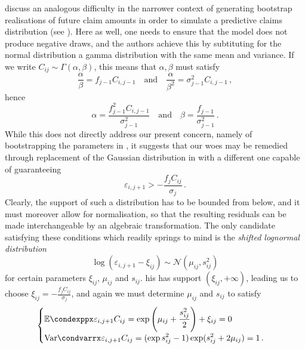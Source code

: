 \documentclass[a4paper]{book}
\begin{document}
\Textcite[238]{england:dist} discuss an analogous difficulty in the narrower context of generating bootstrap realisations of future claim amounts in order to simulate a predictive claims distribution (see ). Here as well, one needs to ensure that the model does not produce negative draws, and the authors achieve this by subtituting for the normal distribution a gamma distribution with the same mean and variance. If we write $C_{ij} \sim \Gamma(\alpha, \beta)$, this means that $\alpha, \beta$ must satisfy
\begin{equation}
\frac{\alpha}{\beta} = f_{j-1} C_{i, j-1} \quad \text{and} \quad \frac{\alpha}{\beta^2} = \sigma^2_{j-1} C_{i, j-1} \,,
\end{equation}
hence
\begin{equation} \label{eq:gamma-sim}
\alpha = \frac{f_{j-1}^2 C_{i, j-1}}{\sigma_{j-1}^2} \quad \text{and} \quad \beta = \frac{f_{j-1}}{\sigma_{j-1}^2} \,.
\end{equation}
While this does not directly address our present concern, namely of bootstrapping the parameters in , it suggests that our woes may be remedied through replacement of the Gaussian distribution in  with a different one capable of guaranteeing
\begin{equation} \label{eq:lower-limit-err}
  \varepsilon_{i, j + 1} > -\frac{f_j C_{ij}}{\sigma_j} \,.
\end{equation}
Clearly, the support of such a distribution has to be bounded from below, and it must moreover allow for normalisation, so that the resulting residuals can be made interchangeable by an algebraic transformation. The only candidate satisfying these conditions which readily springs to mind is the \emph{shifted lognormal distribution}
\begin{equation}
  \log(\varepsilon_{i, j + 1} - \xi_{ij}) \sim \mathcal{N}(\mu_{ij}, s_{ij}^2)
\end{equation} 
for certain parameters $\xi_{ij}$, $\mu_{ij}$ and $s_{ij}$. his has support $(\xi_{ij}, +\infty)$, leading us to choose $\xi_{ij} = -\frac{f_j C_{ij}}{\sigma_j}$, and again we must determine $\mu_{ij}$ and $s_{ij}$ to satisfy
\begin{equation}
  \begin{cases}
    \displaystyle \condexpp{\varepsilon_{i, j + 1}}{C_{ij}} = \exp \left( \mu_{ij} + \frac{s_{ij}^2}{2} \right) + \xi_{ij} = 0 \\ 
    \displaystyle \condvarr{\varepsilon_{i, j + 1}}{C_{ij}} = (\exp{s_{ij}^2} - 1) \exp(s_{ij}^2 + 2 \mu_{ij}) = 1 \,.
  \end{cases}
\end{equation}
\end{document}
